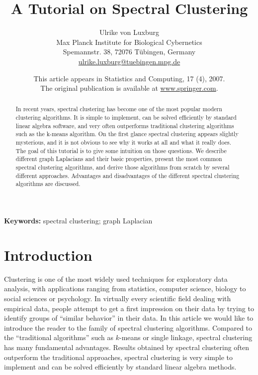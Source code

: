 \documentclass{article}
\begin{document}
%



\title{A Tutorial on Spectral Clustering}
\author{Ulrike von Luxburg\\
Max Planck Institute for Biological Cybernetics\\
Spemannstr. 38, 72076 T{\"u}bingen, Germany\\
\url{ulrike.luxburg@tuebingen.mpg.de}
}
\date{\small This article appears in Statistics and Computing, 17
  (4), 2007. \\The original publication is available at \url{www.springer.com}.}
\maketitle

\begin{abstract} 
  In recent years, spectral clustering has become one of the most
  popular modern clustering algorithms. It is simple to implement, can
  be solved efficiently by standard linear algebra software, and very
  often outperforms traditional clustering algorithms such as the
  k-means algorithm. On the first glance spectral clustering appears
  slightly mysterious, and it is not obvious to see why it works at
  all and what it really does. The goal of this tutorial is to give
  some intuition on those questions.  We describe different graph
  Laplacians and their basic properties, present the most common
  spectral clustering algorithms, and derive those algorithms from
  scratch by several different approaches.  Advantages and
  disadvantages of the different spectral clustering algorithms are
  discussed.
\end{abstract}

{\bf Keywords: } spectral clustering; graph Laplacian\\

%
\section{Introduction} \label{sec-intro}
%




Clustering is one of the most widely used techniques for exploratory data
analysis, with applications ranging from statistics, computer science,
biology to social sciences or psychology. In virtually
every scientific field dealing with empirical data, people attempt to get
a first impression on their data by trying to identify groups of
``similar behavior'' in their data. 
%
In this article we would like to introduce the reader to the family of
spectral clustering algorithms. Compared to the ``traditional
algorithms'' such as $k$-means or single linkage, spectral clustering
has many fundamental advantages. Results obtained by spectral
clustering often outperform the traditional approaches, spectral
clustering is very simple to
implement and can be solved efficiently by standard linear algebra methods. \\
\end{document}
